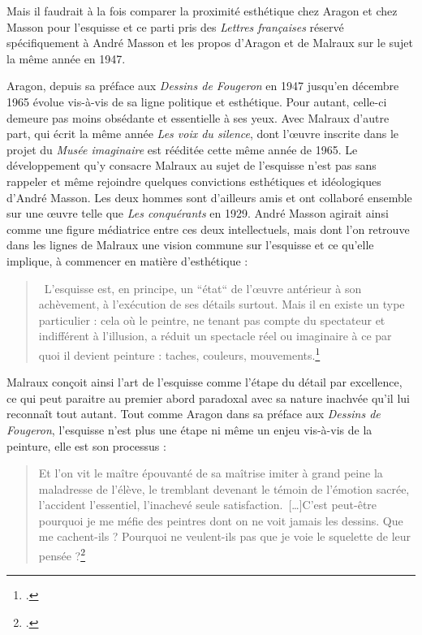 Mais il faudrait à la fois comparer la proximité esthétique chez Aragon et chez Masson pour l'esquisse et ce parti pris des \emph{Lettres françaises} réservé spécifiquement à André Masson et les propos d'Aragon et de Malraux sur le sujet la même année en 1947.

Aragon, depuis sa préface aux \emph{Dessins de Fougeron} en 1947 jusqu'en décembre 1965 évolue vis-à-vis de sa ligne politique et esthétique. Pour autant, celle-ci demeure pas moins obsédante et essentielle à ses yeux. Avec Malraux d'autre part, qui écrit la même année \emph{Les voix du silence}, dont l'\oe{}uvre inscrite dans le projet du \emph{Musée imaginaire} est rééditée cette même année de 1965. Le développement qu'y consacre Malraux au sujet de l'esquisse n'est pas sans rappeler et même rejoindre quelques convictions esthétiques et idéologiques d'André Masson. Les deux hommes sont d'ailleurs amis et ont collaboré ensemble sur une \oe{}uvre telle que \emph{Les conquérants} en 1929. André Masson agirait ainsi comme une figure médiatrice entre ces deux intellectuels, mais dont l'on retrouve dans les lignes de Malraux une vision commune sur l'esquisse et ce qu'elle implique, à commencer en matière d'esthétique : 

\begin{quote}
 L’esquisse est, en principe, un “état“ de l’\oe{}uvre antérieur à son achèvement, à l’exécution de ses détails surtout. Mais il en existe un type particulier : cela où le peintre, ne tenant pas compte du spectateur et indifférent à l’illusion, a réduit un spectacle réel ou imaginaire à ce par quoi il devient peinture : taches, couleurs, mouvements.\footcite[p52]{museeimaginaire}\end{quote} 

Malraux conçoit ainsi l'art de l'esquisse comme l'étape du détail par excellence, ce qui peut paraitre au premier abord paradoxal avec sa nature inachvée qu'il lui reconnaît tout autant. Tout comme Aragon dans sa préface aux \emph{Dessins de Fougeron}, l'esquisse n'est plus une étape ni même un enjeu vis-à-vis de la peinture, elle est son processus :

\begin{quote}
Et l’on vit le maître épouvanté de sa maîtrise imiter à grand peine la maladresse de l’élève, le tremblant devenant le témoin de l’émotion sacrée, l’accident l’essentiel, l’inachevé seule satisfaction. […]C’est peut-être pourquoi je me méfie des peintres dont on ne voit jamais les dessins. Que me cachent-ils ? Pourquoi ne veulent-ils pas que je voie le squelette de leur pensée ?\footcite[p133]{ecritssurla}\end{quote} 

